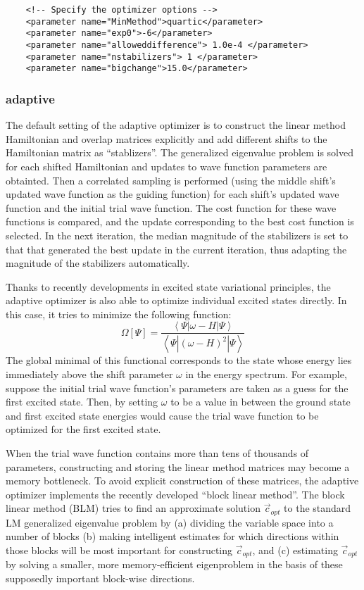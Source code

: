 \begin{lstlisting}
    <!-- Specify the optimizer options -->
    <parameter name="MinMethod">quartic</parameter>
    <parameter name="exp0">-6</parameter>
    <parameter name="alloweddifference"> 1.0e-4 </parameter>
    <parameter name="nstabilizers"> 1 </parameter>
    <parameter name="bigchange">15.0</parameter>
\end{lstlisting}

\subsubsection{adaptive}

The default setting of the adaptive optimizer is to construct the linear method Hamiltonian and overlap matrices explicitly and add different shifts to the Hamiltonian matrix 
as ``stablizers''. The generalized eigenvalue problem is solved for each shifted Hamiltonian and updates to wave function parameters are obtainted. Then a correlated sampling 
is performed (using the middle shift's updated wave function as the guiding function) for each shift's updated wave function and the initial trial wave function.
The cost function for these wave functions is compared, and the update corresponding to the best cost function is selected.
In the next iteration, the median magnitude of the stabilizers is set to that that generated the best update in the current iteration, thus adapting the magnitude of
the stabilizers automatically.

Thanks to recently developments in excited state variational principles, the adaptive optimizer is also able to optimize individual excited states directly.  
In this case, it tries to minimize the following function: 
\begin{equation*}
\Omega[\Psi]=\frac{\left<\Psi|\omega-H|\Psi\right>}{\left<\Psi|{\left(\omega-H\right)}^2|\Psi\right>}
\end{equation*}
The global minimal of this functional corresponds to the state whose energy lies immediately above the shift parameter $\omega$ in the energy spectrum.
For example, suppose the initial 
trial wave function's parameters are taken as a guess for the first excited state.
Then, by setting $\omega$ to be a value in between the ground state and first excited state 
energies would cause the trial wave function to be optimized for the first excited state. 

When the trial wave function contains more than tens of thousands of parameters, constructing and storing the linear method matrices may become a memory bottleneck. 
To avoid explicit
construction of these matrices, the adaptive optimizer implements the recently developed ``block linear method''.  The block linear method (BLM) tries to find an approximate 
solution $\vec{c}_{opt}$ to the standard LM generalized eigenvalue problem by (a) dividing the variable space into a number of blocks (b) making intelligent estimates for which 
directions within those blocks will be most important for constructing $\vec{c}_{opt}$, and (c) estimating $\vec{c}_{opt}$ by solving a smaller, more memory-efficient 
eigenproblem in the basis of these supposedly important block-wise directions. 

